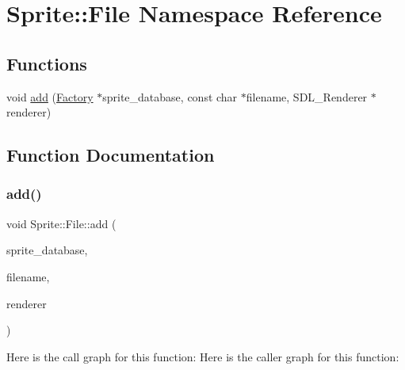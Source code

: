 \hypertarget{namespace_sprite_1_1_file}{}\section{Sprite\+:\+:File Namespace Reference}
\label{namespace_sprite_1_1_file}
\subsection*{Functions}
\begin{DoxyCompactItemize}
\item 
void \mbox{\hyperlink{namespace_sprite_1_1_file_add8c2b02fa452a48f9a19dd9270c0316}{add}} (\mbox{\hyperlink{struct_sprite_1_1_factory}{Factory}} $\ast$sprite\+\_\+database, const char $\ast$filename, S\+D\+L\+\_\+\+Renderer $\ast$renderer)
\end{DoxyCompactItemize}


\subsection{Function Documentation}
\mbox{\label{namespace_sprite_1_1_file_add8c2b02fa452a48f9a19dd9270c0316}} 
\subsubsection{\texorpdfstring{add()}{add()}}
{\footnotesize\ttfamily void Sprite\+::\+File\+::add (\begin{DoxyParamCaption}\item[{\mbox{\hyperlink{struct_sprite_1_1_factory}{Factory}} $\ast$}]{sprite\+\_\+database,  }\item[{const char $\ast$}]{filename,  }\item[{S\+D\+L\+\_\+\+Renderer $\ast$}]{renderer }\end{DoxyParamCaption})}

Here is the call graph for this function\+:
Here is the caller graph for this function\+:
